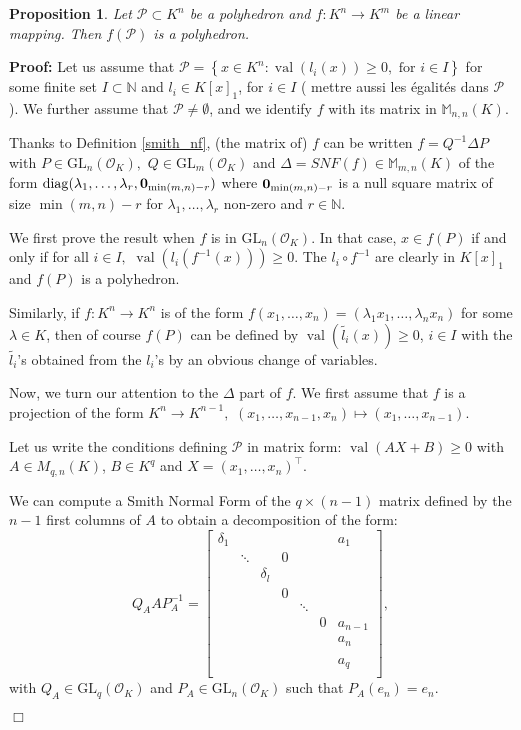 \documentclass[a4paper,12pt]{article}
\newenvironment{proof}{\hbox{}\vspace{-0.8cm} {\bf Proof:}}{\hfill $\Box$}
\newtheorem{proposition}{Proposition}
\newcommand{\N}{\mathbb{N}} %
\newcommand{\allmat}{\mathbb{M}} %
\newcommand{\PP}{\mathcal{P}}
\DeclareMathOperator{\val}{val}
\newcommand{\OK}{\mathcal{O}_K}
\def\diag{\mathrm{diag}}
\newcommand{\GL}{\mathrm{GL}}
\begin{document}
\begin{proposition}
Let $\PP \subset K^n$ be a polyhedron and $f: K^n \rightarrow K^m$
be a linear mapping. Then $f(\PP)$ is a polyhedron.
\end{proposition}
\begin{proof}
Let us assume that 
$\PP = \left\lbrace x \in K^n : \val (l_i (x) ) \geq 0, \textrm{ for } i \in I \right\rbrace$ for some
finite set $I \subset \N$ and $l_i \in K[x]_1$, for $i \in I$ ({\color{blue} mettre aussi les égalités dans $\PP$}).
We further assume that $\PP \neq \emptyset$, and we identify $f$ with its matrix in $\allmat_{n,n}(K)$.

Thanks to Definition \ref{smith_nf}, (the matrix of) $f$
can be written $f=Q^{-1} \Delta P$
with $P \in \GL_n(\OK),$ $Q \in \GL_m(\OK)$
and $\Delta = SNF(f)\in \allmat_{m,n}(K)$ of the form $\diag(\lambda_1, \ldots, \lambda_r, {\bf 0}_{\min(m,n)-r})$
  where ${\bf 0}_{\min(m,n)-r}$ is a null square matrix of size $\min(m,n)-r$ for $\lambda_1,\dots,\lambda_r$ non-zero and $r \in \N.$

We first prove the result when $f$ is in $\GL_n(\OK)$.
In that case, $x \in f(P)$ if and only if for all
$i \in I,$
$\val(l_i (f^{-1}(x))) \geq 0$.
The $l_i \circ f^{-1}$ are clearly in $K[x]_1$
and $f(P)$ is a polyhedron.

Similarly, if $f:K^n \rightarrow K^n$ is of the form
$f(x_1,\dots,x_n)=(\lambda_1 x_1,\dots,\lambda_n x_n)$
for some $\lambda \in K$,
then of course $f(P)$
can be defined by $\val (\widetilde{l_i}(x)) \geq 0$, $i \in I$
with the $\widetilde{l_i}$'s obtained from the $l_i$'s by an
obvious change of variables.

Now, we turn our attention to the $\Delta$ part of $f.$
We first assume that $f$ is a projection 
of the form $K^n \rightarrow K^{n-1},$
$(x_1,\dots,x_{n-1},x_n)\mapsto (x_1,\dots,x_{n-1}).$

Let us write the conditions defining $\PP$
in matrix form:
$\val(A X+B) \geq 0$
with $A \in M_{q,n}(K)$, $B \in K^q$
and $X=(x_1,\dots,x_n)^\intercal.$

We can compute a Smith Normal Form
of the $q \times (n-1)$ matrix defined by the 
$n-1$ first columns of $A$
to obtain a decomposition of the form:
\[ Q_A A P_A^{-1} = \begin{bmatrix}
\delta_1	& 		& 			&   &		 &  &a_1	\\
			& \ddots& 			& 0	&		 &	&		\\
			&		& \delta_l  &   & 		 &	&		\\
			&		&			&0  & 		 &	& 		\\
			&		&			&   & \ddots &	&		\\
			&		&			&	&		 & 0&a_{n-1} \\
			&		&			&	&		 &	&a_n 	\\
			&		&			&	&		 &	&    	\\
			&		&			&	&		 &	&a_q 	\\			
\end{bmatrix},\]
with $Q_A \in \GL_q(\OK)$ and $P_A \in \GL_n(\OK)$ such that $P_A(e_n)=e_n.$


\end{proof}
\end{document}
